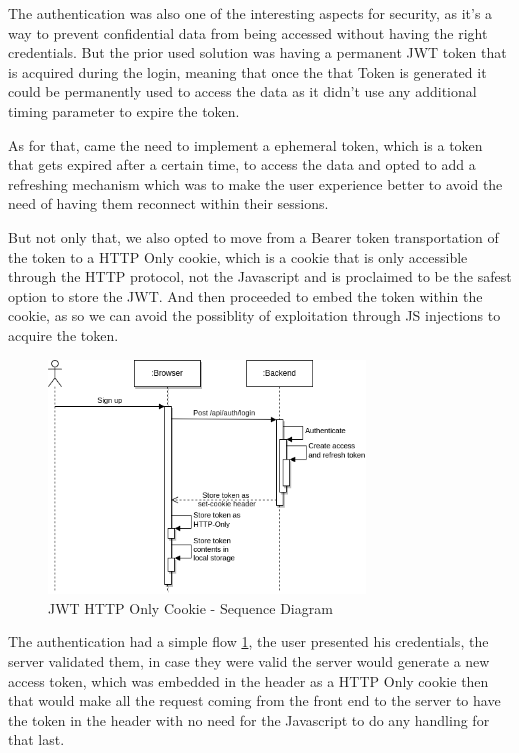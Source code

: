 The authentication was also one of the interesting aspects for security, as it's a way to
prevent confidential data from being accessed without having the right credentials. But the 
prior used solution was having a permanent JWT token that is acquired during the login, meaning 
that once the that Token is generated it could be permanently used to access the data as it didn't
use any additional timing parameter to expire the token.

As for that, came the need to implement a ephemeral token, which is a token that gets expired after
a certain time, to access the data and opted to add a refreshing mechanism which was to make the
user experience better to avoid the need of having them reconnect within their sessions.

But not only that, we also opted to move from a Bearer token transportation of the token to a HTTP Only cookie,
which is a cookie that is only accessible through the HTTP protocol, not the Javascript and is proclaimed to
be the safest option to store the JWT. And then proceeded to embed the token within the cookie,
as so we can avoid the possiblity of exploitation through JS injections to acquire the token.

\begin{figure}[!htpb]
    \centering
    \includegraphics[width=0.75\textwidth]{images/JWTHttpOnly.png}
    \caption{\footnotesize{JWT HTTP Only Cookie - Sequence Diagram}}
    \label{fig:token}
\end{figure}

The authentication had a simple flow \ref{fig:token}, the user presented his credentials,
the server validated them, in case they were valid the server would generate a new access 
token, which was embedded in the header as a HTTP Only cookie then that would make 
all the request coming from the front end to the server to have the token in the header
with no need for the Javascript to do any handling for that last.

